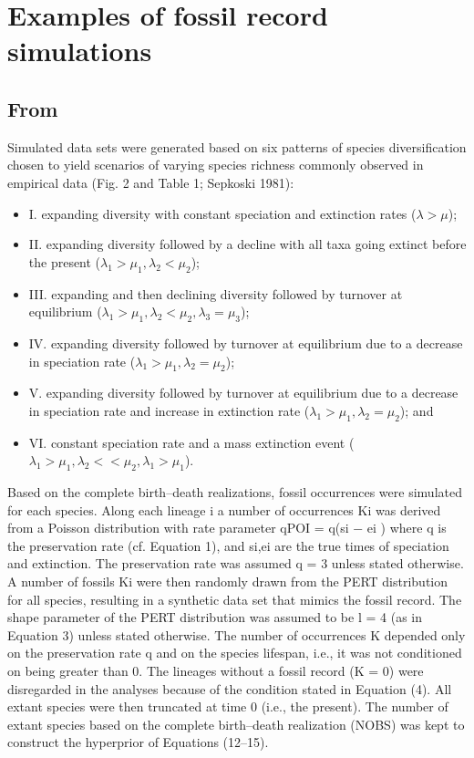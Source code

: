 \documentclass[12pt,twoside,a4paper,pdftex]{scrbook}
\begin{document}
\section{Examples of fossil record simulations}
\subsection{From \citet{Silvestro14}}

Simulated data sets were generated based on six patterns of species diversification chosen to yield scenarios of varying species richness commonly observed in empirical data (Fig. 2 and Table 1; Sepkoski 1981):

\begin{itemize}
\item I. expanding diversity with constant speciation and extinction rates ($ \lambda > \mu $);
\item II. expanding diversity followed by a decline with all taxa going extinct before the present ($ \lambda_1 > \mu_1, \lambda_2 < \mu_2 $);
\item III. expanding and then declining diversity followed by turnover at equilibrium ($ \lambda_1 > \mu_1, \lambda_2 < \mu_2, \lambda_3 = \mu_3 $);
\item IV. expanding diversity followed by turnover at equilibrium due to a decrease in speciation rate ($ \lambda_1 > \mu_1, \lambda_2 = \mu_2 $);
\item V. expanding diversity followed by turnover at equilibrium due to a decrease in speciation rate and increase in extinction rate ($ \lambda_1 > \mu_1, \lambda_2 = \mu_2 $); and
\item VI. constant speciation rate and a mass extinction event ($ \lambda_1 > \mu_1, \lambda_2 << \mu_2, \lambda_1 > \mu_1 $).
\end{itemize}

Based on the complete birth–death realizations, fossil occurrences were simulated for each species. Along each lineage i a number of occurrences Ki was derived from a Poisson distribution with rate parameter qPOI = q(si − ei ) where q is the preservation rate (cf. Equation 1), and si,ei are the true times of speciation and extinction. The preservation rate was assumed q = 3 unless stated otherwise. A number of fossils Ki were then randomly drawn from the PERT distribution for all species, resulting in a synthetic data set that mimics the fossil record. The shape parameter of the PERT distribution was assumed to be l = 4 (as in Equation 3) unless stated otherwise. The number of occurrences K depended only on the preservation rate q and on the species lifespan, i.e., it was not conditioned on being greater than 0. The lineages without a fossil record (K = 0) were disregarded in the analyses because of the condition stated in Equation (4). All extant species were then truncated at time 0 (i.e., the present). The number of extant species based on the complete birth–death realization (NOBS) was kept to construct the hyperprior of Equations (12–15).
\end{document}

